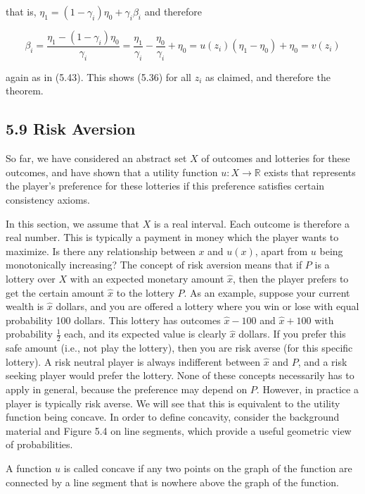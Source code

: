 \documentclass[12pt]{article}
\begin{document}
that is, $\eta_{1}=\left(1-\gamma_{i}\right) \eta_{0}+\gamma_{i} \beta_{i}$ and therefore

$$
\beta_{i}=\frac{\eta_{1}-\left(1-\gamma_{i}\right) \eta_{0}}{\gamma_{i}}=\frac{\eta_{1}}{\gamma_{i}}-\frac{\eta_{0}}{\gamma_{i}}+\eta_{0}=u\left(z_{i}\right)\left(\eta_{1}-\eta_{0}\right)+\eta_{0}=v\left(z_{i}\right)
$$

again as in (5.43). This shows (5.36) for all $z_{i}$ as claimed, and therefore the theorem.

\subsection*{5.9 Risk Aversion}
So far, we have considered an abstract set $X$ of outcomes and lotteries for these outcomes, and have shown that a utility function $u: X \rightarrow \mathbb{R}$ exists that represents the player's preference for these lotteries if this preference satisfies certain consistency axioms.

In this section, we assume that $X$ is a real interval. Each outcome is therefore a real number. This is typically a payment in money which the player wants to maximize. Is there any relationship between $x$ and $u(x)$, apart from $u$ being monotonically increasing? The concept of risk aversion means that if $P$ is a lottery over $X$ with an expected monetary amount $\hat{x}$, then the player prefers to get the certain amount $\hat{x}$ to the lottery $P$. As an example, suppose your current wealth is $\hat{x}$ dollars, and you are offered a lottery where you win or lose with equal probability 100 dollars. This lottery has outcomes $\hat{x}-100$ and $\hat{x}+100$ with probability $\frac{1}{2}$ each, and its expected value is clearly $\hat{x}$ dollars. If you prefer this safe amount (i.e., not play the lottery), then you are risk averse (for this specific lottery). A risk neutral player is always indifferent between $\hat{x}$ and $P$, and a risk seeking player would prefer the lottery. None of these concepts necessarily has to apply in general, because the preference may depend on $P$. However, in practice a player is typically risk averse. We will see that this is equivalent to the utility function being concave. In order to define concavity, consider the background material and Figure 5.4 on line segments, which provide a useful geometric view of probabilities.

A function $u$ is called concave if any two points on the graph of the function are connected by a line segment that is nowhere above the graph of the function.
\end{document}
